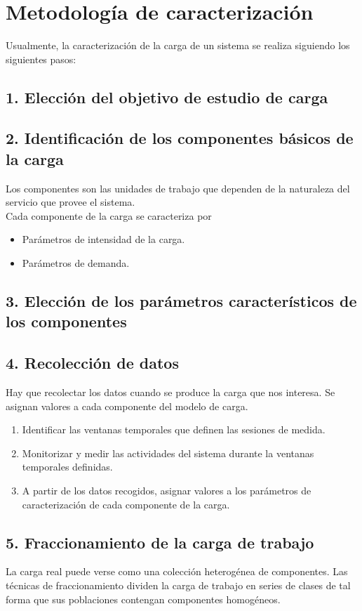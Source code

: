\section{Metodología de caracterización}
Usualmente, la caracterización de la carga de un sistema se realiza siguiendo los siguientes pasos:
\subsection{1. Elección del objetivo de estudio de carga}
\subsection{2. Identificación de los componentes básicos de la carga}
Los componentes son las unidades de trabajo que dependen de la naturaleza del servicio que provee el sistema.\\

Cada componente de la carga se caracteriza por
\begin{itemize}
    \item Parámetros de intensidad de la carga.
    \item Parámetros de demanda.
\end{itemize}

\subsection{3. Elección de los parámetros característicos de los componentes}
\subsection{4. Recolección de datos}
Hay que recolectar los datos cuando se produce la carga que nos interesa.
Se asignan valores a cada componente del modelo de carga.
\begin{enumerate}
    \item Identificar las ventanas temporales que definen las sesiones de medida.
    \item Monitorizar y medir las actividades del sistema durante la ventanas temporales definidas.
    \item A partir de los datos recogidos, asignar valores a los parámetros de caracterización de cada componente de la carga.
\end{enumerate}
\subsection{5. Fraccionamiento de la carga de trabajo}
La carga real puede verse como una colección heterogénea de componentes. Las técnicas de fraccionamiento dividen la carga de trabajo en series de clases de tal forma que sus
poblaciones contengan componentes homogéneos.
